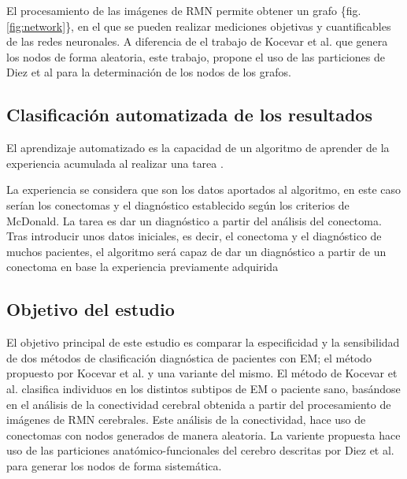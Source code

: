 \documentclass[fleqn,10pt]{UICArticle} %
\begin{document}
El procesamiento de las imágenes de RMN permite obtener un grafo \{fig.\ref{fig:network}\}, en el que se pueden realizar mediciones objetivas y cuantificables de las redes neuronales. A diferencia de el trabajo de Kocevar et al.\cite{Kocevar2016} que genera los nodos de forma aleatoria, este trabajo, propone el uso de las particiones de Diez et al \cite{Diez2015} para la determinación de los nodos de los grafos.

\begin{figure*}[b]
	\centering
	\vspace{5mm} 
	\caption{Grafo basado en las particiones de Destrieux et al.\cite{Destrieux2010}}
	\label{fig:network}
\end{figure*}

\subsection{Clasificación automatizada de los resultados}

El aprendizaje automatizado es la capacidad de un algoritmo de aprender de la experiencia acumulada al realizar una tarea \cite{Friedman1997}.


La experiencia se considera que son los datos aportados al algoritmo, en este caso serían los conectomas y el diagnóstico establecido según los criterios de McDonald. La tarea es dar un diagnóstico a partir del análisis del conectoma. Tras introducir unos datos iniciales, es decir, el conectoma y el diagnóstico de muchos pacientes, el algoritmo será capaz de dar un diagnóstico a partir de un conectoma en base la experiencia previamente adquirida

\subsection{Objetivo del estudio}

El objetivo principal de este estudio es comparar la especificidad y la sensibilidad de dos métodos de clasificación diagnóstica de pacientes con EM; el método propuesto por Kocevar et al.\cite{Kocevar2016} y una variante del mismo. El método de Kocevar et al.\cite{Kocevar2016} clasifica individuos en los distintos subtipos de EM o paciente sano, basándose en el análisis de la conectividad cerebral obtenida a partir del procesamiento de imágenes de RMN cerebrales. Este análisis de la conectividad, hace uso de conectomas con nodos generados de manera aleatoria. La variente propuesta hace uso de las particiones anatómico-funcionales del cerebro descritas por Diez et al.\cite{Diez2015} para generar los nodos de forma sistemática.
\end{document}
